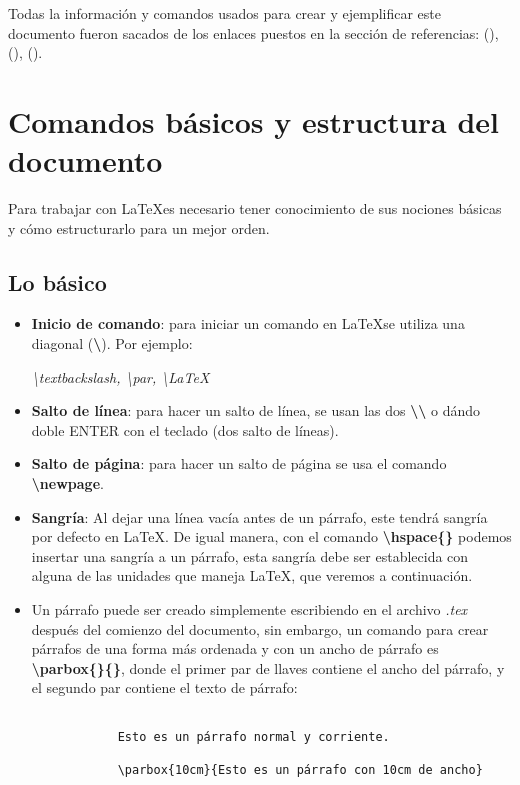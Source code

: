 Todas la información y comandos usados para crear y ejemplificar este documento fueron sacados de los enlaces puestos en la sección de referencias: (\textit{\cite{trefor2}}), (\textit{\cite{trefor1}}), (\textit{\cite{overl}}).



\section{Comandos básicos y estructura del documento}

Para trabajar con \LaTeX es necesario tener conocimiento de sus nociones básicas y cómo estructurarlo para un mejor orden.


\subsection{Lo básico}
\begin{itemize}
    \item \textbf{Inicio de comando}: para iniciar un comando en \LaTeX  se utiliza una diagonal (\textbf{\textbackslash}). Por ejemplo:
    \begin{center}
        \textit{\textbackslash{textbackslash}, \textbackslash{par}, \textbackslash{LaTeX}}
    \end{center}
    \item \textbf{Salto de línea}: para hacer un salto de línea, se usan las dos \textbf{\textbackslash\textbackslash} o dándo doble ENTER con el teclado (dos salto de líneas).
    \item \textbf{Salto de página}: para hacer un salto de página se usa el comando \textbf{\textbackslash{newpage}}.
    \item \textbf{Sangría}: Al dejar una línea vacía antes de un párrafo, este tendrá sangría por defecto en \LaTeX. De igual manera, con el comando \textbf{\textbackslash{hspace\{\}}} podemos insertar una sangría a un párrafo, esta sangría debe ser establecida con alguna de las unidades que maneja \LaTeX, que veremos a continuación.
    \item Un párrafo puede ser creado simplemente escribiendo en el archivo \textit{.tex} después del comienzo del documento, sin embargo, un comando para crear párrafos de una forma más ordenada y con un ancho de párrafo es \textbf{\textbackslash{parbox\{\}\{\}}}, donde el primer par de llaves contiene el ancho del párrafo, y el segundo par contiene el texto de párrafo:
    \begin{lstlisting}
        
            Esto es un párrafo normal y corriente.

            \parbox{10cm}{Esto es un párrafo con 10cm de ancho}
        
    \end{lstlisting}
\end{itemize}


